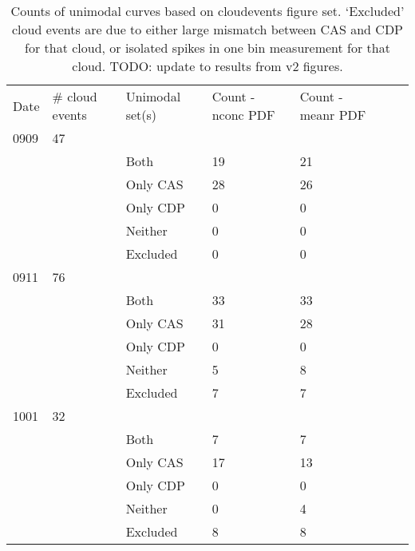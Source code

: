 \documentclass{article}
\begin{document}
\begin{table}[ht]
\centering
\begin{tabular}{lllllll}
	Date & \# cloud events & Unimodal set(s) & Count - nconc PDF& Count - meanr PDF\\
0909 & 47                 &                   &                          &                          \\
     &                    & Both     & 19                       & 21                       \\
     &                    & Only CAS & 28                       & 26                       \\
     &                    & Only CDP & 0                        & 0                        \\
     &                    & Neither  & 0                        & 0                        \\
     &                    & Excluded & 0                        & 0                        \\
0911 & 76                 &                   &                          &                          \\
     &                    & Both     & 33                       & 33                       \\
     &                    & Only CAS & 31                       & 28                       \\
     &                    & Only CDP & 0                        & 0                        \\
     &                    & Neither  & 5                        & 8                        \\
     &                    & Excluded & 7                        & 7                        \\
1001 & 32                 &                   &                          &                          \\
     &                    & Both     & 7                        & 7                        \\
     &                    & Only CAS & 17                       & 13                       \\
     &                    & Only CDP & 0                        & 0                        \\
     &                    & Neither  & 0                        & 4                        \\
     &                    & Excluded & 8                        & 8                       
\end{tabular}
\caption{Counts of unimodal curves based on cloudevents figure set. `Excluded' cloud events are due to either large mismatch between CAS and CDP for that cloud, or isolated spikes in one bin measurement for that cloud. TODO: update to results from v2 figures.}
\label{unimodal}
\end{table}
\end{document}
